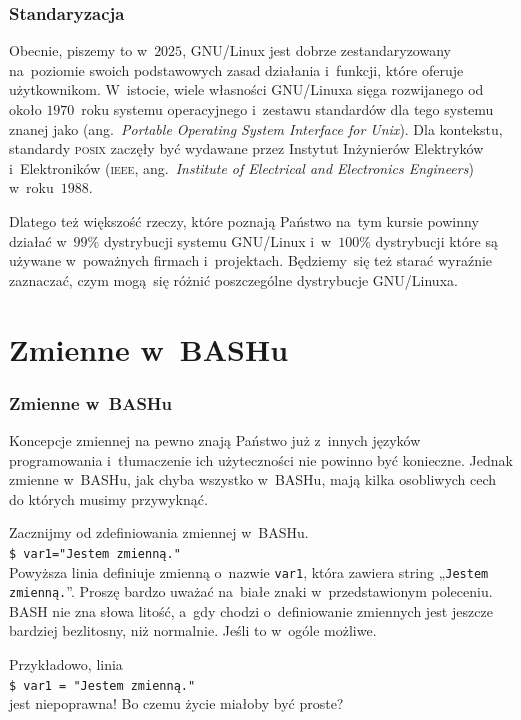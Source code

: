 \documentclass[10pt,t]{beamer}
\begin{document}
\begin{frame}
  \frametitle{Standaryzacja}


  Obecnie, piszemy to w~$2025$, GNU/Linux jest dobrze zestandaryzowany
  na~poziomie swoich podstawowych zasad działania i~funkcji, które oferuje
  użytkownikom. W~istocie, wiele własności GNU/Linuxa sięga rozwijanego od
  około $1970$~roku systemu operacyjnego
   i~zestawu
  standardów dla tego systemu znanej jako
  (ang.~\textit{Portable Operating System Interface for Unix}). Dla
  kontekstu, standardy \textsc{posix} zaczęły być wydawane przez Instytut
  Inżynierów Elektryków i~Elektroników (\textsc{ieee},
  ang.~\textit{Institute of Electrical and Electronics Engineers})
  w~roku~$1988$.

  Dlatego też większość rzeczy, które poznają Państwo na~tym kursie powinny
  działać w~$99\%$ dystrybucji systemu GNU/Linux i~w~$100\%$ dystrybucji
  które są używane w~poważnych firmach i~projektach. Będziemy~się też
  starać wyraźnie zaznaczać, czym mogą~się różnić poszczególne dystrybucje
  GNU/Linuxa.

\end{frame}







\section{Zmienne w~BASHu}



\begin{frame}
  \frametitle{Zmienne w~BASHu}


  Koncepcje zmiennej na pewno znają Państwo już z~innych języków
  programowania i~tłumaczenie ich użyteczności nie powinno być konieczne.
  Jednak zmienne w~BASHu, jak chyba wszystko w~BASHu, mają kilka osobliwych
  cech do których musimy przywyknąć.

  Zacznijmy od zdefiniowania zmiennej w~BASHu. \\
  \texttt{\$ var1="Jestem zmienną."} \\
  Powyższa linia definiuje zmienną o~nazwie \texttt{var1}, która zawiera
  string „\texttt{Jestem zmienną.}”. Proszę bardzo uważać
  na~\alert{białe znaki} w~przedstawionym poleceniu. BASH nie zna słowa
  litość, a~gdy chodzi o~definiowanie zmiennych jest jeszcze bardziej
  bezlitosny, niż normalnie. Jeśli to w~ogóle możliwe.

  Przykładowo, linia \\
  \texttt{\$ var1 = "Jestem zmienną."} \\
  jest \alert{niepoprawna}! Bo czemu życie miałoby być proste?

\end{frame}
\end{document}
